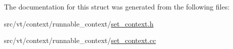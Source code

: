The documentation for this struct was generated from the following files\+:\begin{DoxyCompactItemize}
\item 
src/vt/context/runnable\+\_\+context/\hyperlink{set__context_8h}{set\+\_\+context.\+h}\item 
src/vt/context/runnable\+\_\+context/\hyperlink{set__context_8cc}{set\+\_\+context.\+cc}\end{DoxyCompactItemize}
